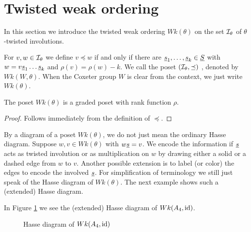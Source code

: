 \section{Twisted weak ordering}
\label{sec:twisted-involutions-twisted-weak-ordering}

In this section we introduce the twisted weak ordering $Wk(\theta)$ on the set $\mathcal{I}_{\theta}$ of $\theta$-twisted involutions.

\begin{defi}
	For $v,w \in \mathcal{I}_{\theta}$ we define $v \preceq w$ if and only if there are $\underline{s}_1, \ldots, \underline{s}_k \in \underline{S}$ with $w = v \underline{s}_1 \ldots \underline{s}_k$ and $\rho(v) = \rho(w) - k$. We call the poset $(\mathcal{I}_{\theta},\preceq)$ , denoted by $Wk(W, \theta)$. When the Coxeter group $W$ is clear from the context, we just write $Wk(\theta)$.
\end{defi}

\begin{prop}
	The poset $Wk(\theta)$ is a graded poset with rank function $\rho$.

	\begin{proof}
		Follows immediately from the definition of $\preceq$.
	\end{proof}
\end{prop}

By a diagram of a poset $Wk(\theta)$, we do not just mean the ordinary Hasse diagram. Suppose $w,v \in Wk(\theta)$ with $w \underline{s} = v$. We encode the information if $\underline{s}$ acts as twisted involution or as multiplication on $w$ by drawing either a solid or a dashed edge from $w$ to $v$. Another possible extension is to label (or color) the edges to encode the involved $\underline{s}$. For simplification of terminology we still just speak of the Hasse diagram of $Wk(\theta)$. The next example shows such a (extended) Hasse diagram.

\begin{exam}
	In Figure \ref{fig:a4} we see the (extended) Hasse diagram of $Wk(A_4, \operatorname{id})$.

	\begin{figure}[ht]
		\centering
		
		\caption{Hasse diagram of $Wk(A_4, \operatorname{id})$}
		\label{fig:a4}
	\end{figure}
\end{exam}

